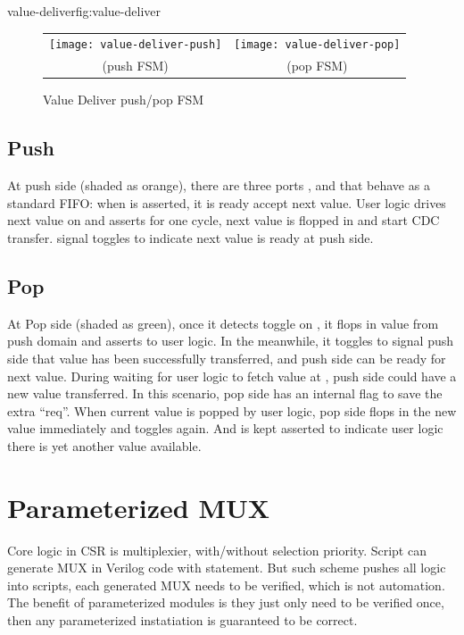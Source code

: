 \documentclass[10pt,oneside]{book}
\begin{document}
{value-deliver}{fig:value-deliver}

\begin{figure}[bthp]
  {\small
    \begin{tabular}{cc}
      \texttt{[image: value-deliver-push]} &
      \texttt{[image: value-deliver-pop]} \\
      (push FSM) & (pop FSM)\\
    \end{tabular}
  }
  \caption{Value Deliver push/pop FSM}\label{fig:value-deliver-fsm}
\end{figure}

\subsection{Push}
At push side (shaded as orange), there are three ports , 
 and  that behave as a standard FIFO: when 
 is asserted, it is ready accept next value. User logic
drives next value on  and asserts  for one cycle, 
next value is flopped in and start CDC transfer.  signal
toggles to indicate next value is ready at push side. 


\subsection{Pop}
At Pop side (shaded as green), once it detects toggle on ,
it flops in value from push domain and asserts  to user 
logic. In the meanwhile, it toggles  to signal push side
that value has been successfully transferred, and push side can be 
ready for next value. 
During waiting for user logic to fetch value at , push
side could have a new value transferred. In this scenario, pop
side has an internal flag to save the extra ``req''. When current
value is popped by user logic, pop side flops in the new value 
immediately and toggles  again. And  is kept
asserted to indicate user logic there is yet another value available.




\section{Parameterized MUX}
Core logic in CSR is multiplexier, with/without selection priority. 
Script can generate MUX in Verilog code with  statement. 
But such scheme pushes all logic into scripts, each generated MUX
needs to be verified, which is not automation. The benefit of 
parameterized modules is they just only need to be verified once, 
then any parameterized instatiation is guaranteed to be correct. 
\end{document}
